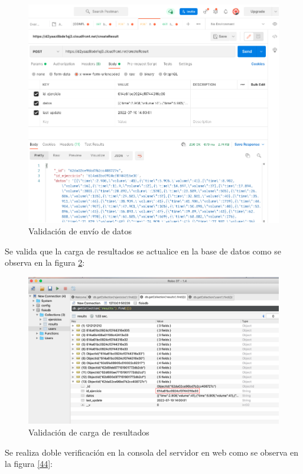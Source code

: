 \documentclass[12pt]{article}
\begin{document}
\begin{figure}[ht]
\centering
\includegraphics[scale=0.3]{imag/TEST3sendData.png}
\caption{Validación de envío de datos}
\label{42}
\end{figure}
\FloatBarrier

Se valida que la carga de resultados se actualice en la base de datos como se observa en la figura \ref{43}:

\begin{figure}[ht]
\centering
\includegraphics[scale=0.3]{imag/TEST4Results.png}
\caption{Validación de carga de resultados }
\label{43}
\end{figure}
\FloatBarrier

Se realiza doble verificación en la consola del servidor en web como se observa en la figura \ref{44}:
\end{document}
